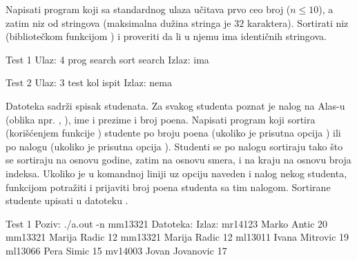 \begin{Exercise}[label=523]
  Napisati program koji sa standardnog ulaza učitava prvo ceo broj
   ($n \leq 10$), a zatim niz  od  stringova
  (maksimalna dužina stringa je $32$ karaktera). Sortirati niz
   (bibliotečkom funkcijom ) i proveriti da li u
  njemu ima identičnih stringova.
  
\begin{miditest}
\begin{test}{Test 1}
Ulaz:   4 prog search sort search
Izlaz:  ima
\end{test}
\end{miditest}
\begin{miditest}
\begin{test}{Test 2}
Ulaz:   3 test kol ispit
Izlaz:  nema
\end{test}
\end{miditest}
  
\end{Exercise}

\begin{Exercise}[label=524]
  Datoteka  sadrži spisak studenata. Za svakog
  studenta poznat je nalog na Alas-u (oblika npr. ,
  ), ime i prezime i broj poena. Napisati program koji
  sortira (korišćenjem funkcije ) studente po broju poena
  (ukoliko je prisutna opcija ) ili po nalogu (ukoliko je
  prisutna opcija ). Studenti se po nalogu sortiraju tako što
  se sortiraju na osnovu godine, zatim na osnovu smera, i na kraju na
  osnovu broja indeksa. Ukoliko je u komandnoj liniji uz opciju
   naveden i nalog nekog studenta, funkcijom 
  potražiti i prijaviti broj poena studenta sa tim nalogom. Sortirane
  studente upisati u datoteku .
  
\begin{maxitest}
\begin{test}{Test 1}
Poziv: ./a.out -n mm13321
Datoteka:                         Izlaz:
mr14123 Marko Antic 20            mm13321 Marija Radic 12
mm13321 Marija Radic 12
ml13011 Ivana Mitrovic 19
ml13066 Pera Simic 15
mv14003 Jovan Jovanovic 17
\end{test}
\end{maxitest}
  
\end{Exercise}

